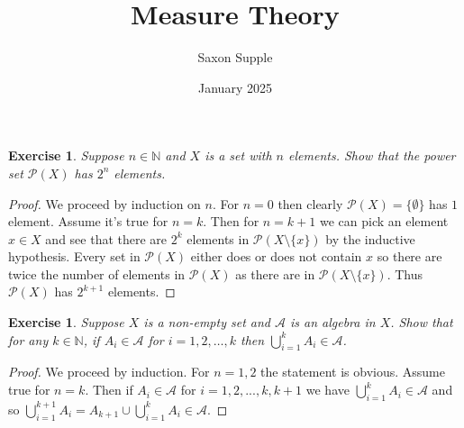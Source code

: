 \documentclass{article}
\title{Measure Theory}
\author{Saxon Supple}
\date{January 2025}
\newtheorem{exercise}[theorem]{Exercise}
\begin{document}
\maketitle

\begin{exercise}
Suppose $n \in \mathbb{N}$ and $X$ is a set with $n$ elements. Show that the power set $\mathcal{P}(X)$ has $2^n$ elements.
\end{exercise}
\begin{proof}
We proceed by induction on $n$. For $n=0$ then clearly $\mathcal{P}(X)=\{\emptyset\}$ has $1$ element. Assume it's true for $n=k$. Then for $n=k+1$ we can pick an element $x\in X$ and see that there are $2^k$ elements in $\mathcal{P}(X\setminus\{x\})$ by the inductive hypothesis. Every set in $\mathcal{P}(X)$ either does or does not contain $x$ so there are twice the number of elements in $\mathcal{P}(X)$ as there are in $\mathcal{P}(X\setminus\{x\})$. Thus $\mathcal{P}(X)$ has $2^{k+1}$ elements.
\end{proof}

\begin{exercise}
    Suppose $X$ is a non-empty set and $\mathcal{A}$ is an algebra in $X$. Show that for any $k \in \mathbb{N}$, if $A_i \in \mathcal{A}$ for $i = 1, 2, \ldots, k$ then $\bigcup_{i=1}^k A_i \in \mathcal{A}$.
\end{exercise}
\begin{proof}
We proceed by induction. For $n=1,2$ the statement is obvious. Assume true for $n=k$. Then if $A_i\in\mathcal{A}$ for $i=1,2,...,k,k+1$ we have $\bigcup_{i=1}^kA_i\in\mathcal{A}$ and so $\bigcup_{i=1}^{k+1}A_i=A_{k+1}\cup\bigcup_{i=1}^kA_i\in\mathcal{A}$. 
\end{proof}
\end{document}
